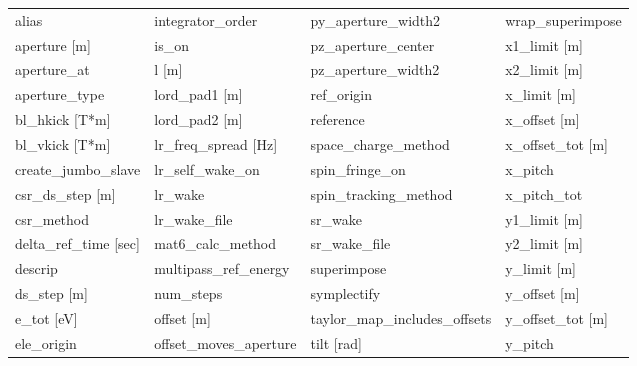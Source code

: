  \begin{tabular}{llll} \toprule
alias                            & integrator_order                 & py_aperture_width2               & wrap_superimpose                 \\
aperture [m]                     & is_on                            & pz_aperture_center               & x1_limit [m]                     \\
aperture_at                      & l [m]                            & pz_aperture_width2               & x2_limit [m]                     \\
aperture_type                    & lord_pad1 [m]                    & ref_origin                       & x_limit [m]                      \\
bl_hkick [T*m]                   & lord_pad2 [m]                    & reference                        & x_offset [m]                     \\
bl_vkick [T*m]                   & lr_freq_spread [Hz]              & space_charge_method              & x_offset_tot [m]                 \\
create_jumbo_slave               & lr_self_wake_on                  & spin_fringe_on                   & x_pitch                          \\
csr_ds_step [m]                  & lr_wake                          & spin_tracking_method             & x_pitch_tot                      \\
csr_method                       & lr_wake_file                     & sr_wake                          & y1_limit [m]                     \\
delta_ref_time [sec]             & mat6_calc_method                 & sr_wake_file                     & y2_limit [m]                     \\
descrip                          & multipass_ref_energy             & superimpose                      & y_limit [m]                      \\
ds_step [m]                      & num_steps                        & symplectify                      & y_offset [m]                     \\
e_tot [eV]                       & offset [m]                       & taylor_map_includes_offsets      & y_offset_tot [m]                 \\
ele_origin                       & offset_moves_aperture            & tilt [rad]                       & y_pitch                          \\

\end{tabular}
